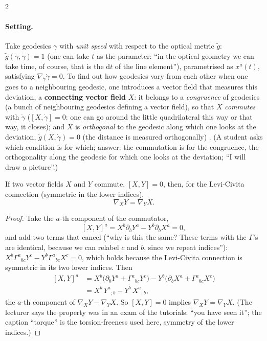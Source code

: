 \begin{paracol}{2}
\paragraph{Setting.} Take geodesics $\gamma$ with \emph{unit speed} with respect to the optical metric $\tilde g$: $\tilde g(\dot\gamma,\dot\gamma)=1$ (one can take $t$ as the parameter: ``in the optical geometry we can take time, of course, that is the $\mathrm dt$ of the line element''), parametrised as $x^a(t)$, satisfying $\nabla_{\dot\gamma}\dot\gamma=0$. To find out how geodesics vary from each other when one goes to a neighbouring geodesic, one introduces a vector field that measures this deviation, a \textbf{connecting vector field} $X$: it belongs to a \emph{congruence} of geodesics (a bunch of neighbouring geodesics defining a vector field), so that $X$ \emph{commutes} with $\dot\gamma$ ($[X,\dot\gamma]=0$: one can go around the little quadrilateral this way or that way, it closes); and $X$ is \emph{orthogonal} to the geodesic along which one looks at the deviation, $\tilde g(X,\dot\gamma)=0$ (the distance is measured orthogonally) . (A student asks which condition is for which; answer: the commutation is for the congruence, the orthogonality along the geodesic for which one looks at the deviation; ``I will draw a picture''.)

\begin{lemma}\label{lem:c17-commute}
If two vector fields $X$ and $Y$ commute, $[X,Y]=0$, then, for the Levi-Civita connection (symmetric in the lower indices),
\[
  \nabla_XY=\nabla_YX.
\]
\end{lemma}
\begin{proof}
Take the $a$-th component of the commutator,
\[
  [X,Y]^a=X^b\partial_bY^a-Y^b\partial_bX^a=0,
\]
and add two terms that cancel (``why is this the same? These terms with the $\Gamma$'s are identical, because we can relabel $c$ and $b$, since we repeat indices''): $X^b\Gamma^a{}_{bc}Y^c-Y^b\Gamma^a{}_{bc}X^c=0$, which holds because the Levi-Civita connection is symmetric in its two lower indices. Then
\[\begin{aligned}
  [X,Y]^a&=X^b\bigl(\partial_bY^a+\Gamma^a{}_{bc}Y^c\bigr)-Y^b\bigl(\partial_bX^a+\Gamma^a{}_{bc}X^c\bigr)\\
  &=X^b\,Y^a{}_{;b}-Y^b\,X^a{}_{;b},
\end{aligned}\]
the $a$-th component of $\nabla_XY-\nabla_YX$. So $[X,Y]=0$ implies $\nabla_XY=\nabla_YX$. (The lecturer says the property was in an exam of the tutorials: ``you have seen it''; the caption ``torque'' is the torsion-freeness used here, symmetry of the lower indices.) 
\end{proof}


\end{paracol}
